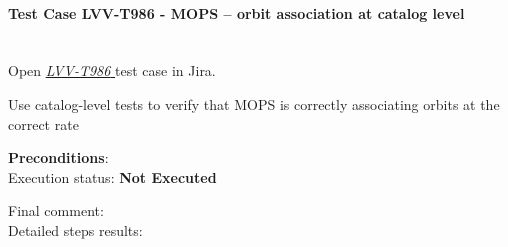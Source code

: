 \documentclass[DM,lsstdraft,STR,toc]{lsstdoc}
\begin{document}
\paragraph{Test Case LVV-T986 - MOPS -- orbit association at catalog level
 }\mbox{}\\

Open  \href{https://jira.lsstcorp.org/secure/Tests.jspa#/testCase/LVV-T986}{\textit{ LVV-T986 } }
test case in Jira.

Use catalog-level tests to verify that MOPS is correctly associating
orbits at the correct rate


\textbf{ Preconditions}:\\


Execution status: {\bf Not Executed }

Final comment:\\


Detailed steps results:
\end{document}
